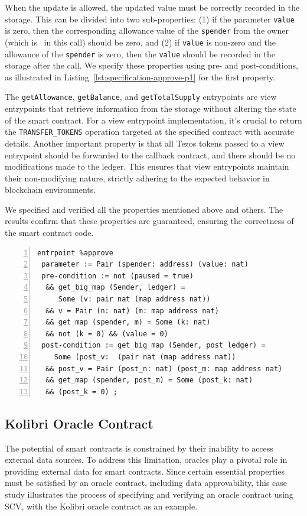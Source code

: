 \documentclass[runningheads]{llncs}
\begin{document}
When the update is allowed, the updated value must be correctly recorded in the storage. This can be divided into two sub-properties: (1) if the parameter \lstinline/value/ is zero, then the corresponding allowance value of the \lstinline/spender/ from the owner (which is \SENDER\ in this call) should be zero, and (2) if \lstinline/value/ is non-zero and the allowance of the \lstinline/spender/ is zero, then the \lstinline/value/ should be recorded in the storage after the call. We specify these properties using pre- and post-conditions, as illustrated in Listing~\ref{lst:specification-approve-p1} for the first property.

The \lstinline/getAllowance/, \lstinline/getBalance/, and \lstinline/getTotalSupply/ entrypoints are view entrypoints that retrieve information from the storage without altering the state of the smart contract. For a view entrypoint implementation, it's crucial to return the \lstinline/TRANSFER_TOKENS/ operation targeted at the specified contract with accurate details. Another important property is that all Tezos tokens passed to a view entrypoint should be forwarded to the callback contract, and there should be no modifications made to the ledger. This ensures that view entrypoints maintain their non-modifying nature, strictly adhering to the expected behavior in blockchain environments.

We specified and verified all the properties mentioned above and others. The results confirm that these properties are guaranteed, ensuring the correctness of the smart contract code.
\begin{lstlisting}[float=tp,captionpos=b,caption={Specification of the \lstinline/approve/ entrypoint (Property 1)},label={lst:specification-approve-p1},numbers=left]
entrpoint %approve
 parameter := Pair (spender: address) (value: nat)
 pre-condition := not (paused = true)
  && get_big_map (Sender, ledger) = 
     Some (v: pair nat (map address nat))
  && v = Pair (n: nat) (m: map address nat) 
  && get_map (spender, m) = Some (k: nat) 
  && not (k = 0) && (value = 0)
 post-condition := get_big_map (Sender, post_ledger) = 
    Some (post_v:  (pair nat (map address nat))
  && post_v = Pair (post_n: nat) (post_m: map address nat) 
  && get_map (spender, post_m) = Some (post_k: nat) 
  && (post_k = 0) ;
\end{lstlisting}

\subsection{Kolibri Oracle Contract}
\label{sec:kolibri-oracle-contr}
The potential of smart contracts is constrained by their inability to access external data sources. To address this limitation, oracles play a pivotal role in providing external data for smart contracts. Since certain essential properties must be satisfied by an oracle contract, including data approvability, this case study illustrates the process of specifying and verifying an oracle contract using SCV, with the Kolibri oracle contract \cite{kolibri} as an example.
\end{document}
